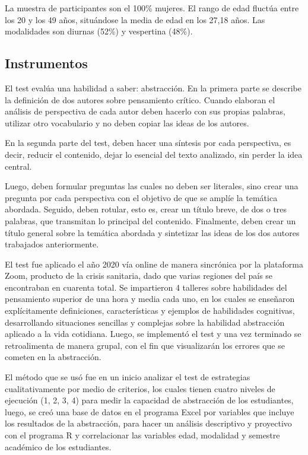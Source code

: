 \documentclass{textolivre}
\begin{document}
La muestra de participantes son el 100\% mujeres. El rango de edad fluctúa entre los 20 y los 49 años, situándose la media de edad en los 27,18 años. Las modalidades son diurnas (52\%) y vespertina (48\%).

\subsection{Instrumentos}\label{instru}
El test evalúa una habilidad a saber: abstracción. En la primera parte se describe la definición de dos autores sobre pensamiento crítico. Cuando elaboran el análisis de perspectiva de cada autor deben hacerlo con sus propias palabras, utilizar otro vocabulario y no  deben copiar las ideas de los autores.

En la segunda parte del test, deben hacer una síntesis por cada perspectiva, es decir, reducir el contenido, dejar lo esencial del texto analizado, sin perder la idea central.

Luego, deben formular preguntas las cuales no deben ser literales, sino crear una pregunta por cada perspectiva con el objetivo de que se amplíe la temática abordada. Seguido, deben rotular, esto es, crear un título breve, de dos o tres palabras, que transmitan lo principal del contenido. Finalmente, deben crear un título general sobre la temática abordada y sintetizar las ideas de los dos autores trabajados anteriormente.

El test fue aplicado el año 2020 vía online de manera sincrónica por la plataforma Zoom, producto de la crisis sanitaria, dado que varias regiones del país se encontraban en cuarenta total.  Se impartieron 4 talleres sobre habilidades del pensamiento superior de una hora y media cada uno, en los cuales se enseñaron explícitamente definiciones, características y ejemplos de habilidades cognitivas, desarrollando situaciones sencillas y complejas sobre la habilidad abstracción aplicado a la vida cotidiana.  Luego, se implementó el test y una vez terminado se retroalimenta de manera grupal, con el fin que visualizarán los errores que se cometen en la abstracción.

El método que se usó fue en un inicio analizar el test de estrategias cualitativamente por medio de criterios, los cuales tienen cuatro niveles de ejecución (1, 2, 3, 4) para medir la capacidad de abstracción de los estudiantes, luego, se creó una base de datos en el programa Excel por variables que incluye los resultados  de la abstracción, para hacer un análisis descriptivo y proyectivo con el programa R y correlacionar las variables edad, modalidad y  semestre académico de los estudiantes.
\end{document}
